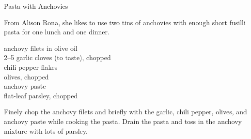 \begin{entry}{Pasta with Anchovies}

\begin{open}
  From Alison Rona, she likes to use two tins of anchovies with enough short
  fusilli pasta for one lunch and one dinner.
\end{open}
\begin{ingredients}
    anchovy filets in olive oil\\
    \numrange{2}{5} garlic cloves (to taste), chopped\\
    chili pepper flakes\\
    olives, chopped\\
    anchovy paste\\
    flat-leaf parsley, chopped
\end{ingredients}
Finely chop the anchovy filets and briefly \saute with the garlic, chili
pepper, olives, and anchovy paste while cooking the pasta.  Drain the pasta
and toss in the anchovy mixture with lots of parsley.
\end{entry}

